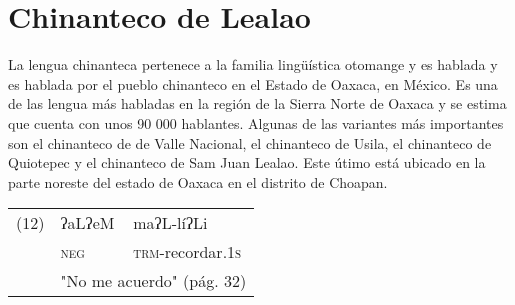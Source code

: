 \section*{Chinanteco de Lealao}

\noindent La lengua chinanteca pertenece a la familia lingüística otomange y es hablada y es hablada por el pueblo chinanteco en el Estado de Oaxaca, en México. Es una de las lengua más habladas en la región de la Sierra Norte de Oaxaca y se estima que cuenta con unos 90 000 hablantes. Algunas de las variantes más importantes son el chinanteco de de Valle Nacional, el chinanteco de Usila, el chinanteco de Quiotepec y el chinanteco de Sam Juan Lealao. Este útimo está ubicado en la parte noreste del estado de Oaxaca en el distrito de Choapan. \vspace{1cm}

{\setmainfont{Doulos SIL}
    \begin{tabular}{lll}
        (12) & ʔaLʔeM                                        & maʔL-líʔLi                        \\
             & \textsc{neg}                                  & \textsc{trm}-recordar.\textsc{1s} \\
             & \multicolumn{2}{l}{"No me acuerdo" (pág. 32)}
    \end{tabular}

}